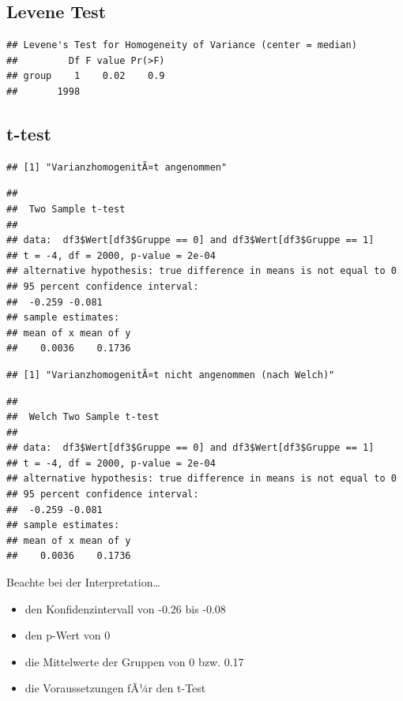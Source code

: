 \documentclass[
]{book}
\providecommand{\tightlist}{%
  \setlength{\itemsep}{0pt}\setlength{\parskip}{0pt}}
\begin{document}
\hypertarget{levene-test-1}{%
\subsection{Levene Test}\label{levene-test-1}}

\begin{verbatim}
## Levene's Test for Homogeneity of Variance (center = median)
##         Df F value Pr(>F)
## group    1    0.02    0.9
##       1998
\end{verbatim}

\hypertarget{t-test-1}{%
\subsection{t-test}\label{t-test-1}}

\begin{verbatim}
## [1] "VarianzhomogenitÃ¤t angenommen"
\end{verbatim}

\begin{verbatim}
## 
##  Two Sample t-test
## 
## data:  df3$Wert[df3$Gruppe == 0] and df3$Wert[df3$Gruppe == 1]
## t = -4, df = 2000, p-value = 2e-04
## alternative hypothesis: true difference in means is not equal to 0
## 95 percent confidence interval:
##  -0.259 -0.081
## sample estimates:
## mean of x mean of y 
##    0.0036    0.1736
\end{verbatim}

\begin{verbatim}
## [1] "VarianzhomogenitÃ¤t nicht angenommen (nach Welch)"
\end{verbatim}

\begin{verbatim}
## 
##  Welch Two Sample t-test
## 
## data:  df3$Wert[df3$Gruppe == 0] and df3$Wert[df3$Gruppe == 1]
## t = -4, df = 2000, p-value = 2e-04
## alternative hypothesis: true difference in means is not equal to 0
## 95 percent confidence interval:
##  -0.259 -0.081
## sample estimates:
## mean of x mean of y 
##    0.0036    0.1736
\end{verbatim}

Beachte bei der Interpretation\ldots{}

\begin{itemize}
\tightlist
\item
  den Konfidenzintervall von -0.26 bis -0.08
\item
  den p-Wert von 0
\item
  die Mittelwerte der Gruppen von 0 bzw. 0.17
\item
  die Voraussetzungen fÃ¼r den t-Test
\end{itemize}
\end{document}
